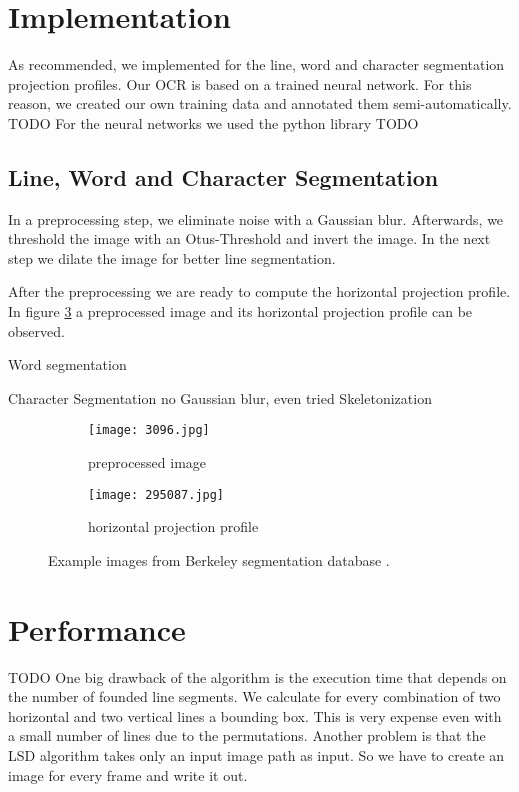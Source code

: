\documentclass[english, paper=a4]{scrartcl}
\begin{document}
\section{Implementation}
As recommended, we implemented for the line, word and character segmentation projection profiles. 
Our OCR is based on a trained neural network. For this reason, we created our own training data and annotated them
semi-automatically. TODO
For the neural networks we used the python library TODO


\subsection{Line, Word and Character Segmentation}
In a preprocessing step, we eliminate noise with a Gaussian blur. Afterwards, we threshold the image with 
an Otus-Threshold and invert the image. In the next step we dilate the image for better line segmentation.

After the preprocessing we are ready to compute the horizontal projection profile. In figure \ref{fig:ex_proj_horz}
a preprocessed image and its horizontal projection profile can be observed.

Word segmentation

Character Segmentation
no Gaussian blur, even tried Skeletonization  

\begin{figure}[b!]
	\centering
	\begin{subfigure}[t!]{0.30\textwidth}
		\texttt{[image: 3096.jpg]}
		\caption{preprocessed image}
		\label{fig:ex2a}
	\end{subfigure}
	\begin{subfigure}[t!]{0.30\textwidth}
		\texttt{[image: 295087.jpg]}
		\caption{horizontal projection profile}
		\label{fig:ex2b}
	\end{subfigure}
	\caption{Example images from Berkeley segmentation database \cite{martin01}.}
	\label{fig:ex_proj_horz}
\end{figure}

\section{Performance}
TODO
One big drawback of the algorithm is the execution time that depends on the number of founded line segments. We calculate for every combination of two horizontal and two vertical lines a bounding box. This is very expense even with a small number of lines due to the permutations. Another problem is that the LSD algorithm takes only an input image path as input. So we have to create an image for every frame and write it out.
\end{document}
